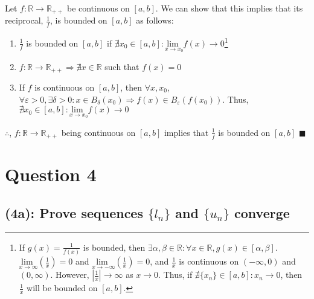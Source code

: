 \documentclass{article}
\newcommand{\R}{\mathbb{R}}
\newcommand{\lmt}{\underset{x\rightarrow\infty}{\text{lim }}}
\newcommand{\neglmt}{\underset{x\rightarrow-\infty}{\text{lim }}}
\begin{document}
Let $f:\R\rightarrow\R_{++}$ be continuous on $[a,b]$. We can show that this implies that its reciprocal, $\frac{1}{f}$, is bounded on $[a,b]$ as follows:
\begin{enumerate}

	\item $\frac{1}{f}$ is bounded on $[a,b]$  if $\nexists x_0\in[a,b]: \underset{x\rightarrow x_0}{\text{lim }}f(x)\rightarrow0$\footnote{
			If $g(x)=\frac{1}{f(x)}$ is bounded, then $\exists \alpha,\beta\in\R: \forall x\in\R,g(x)\in[\alpha,\beta]$. $\lmt(\frac{1}{x})=0$ and $\neglmt(\frac{1}{x})=0$, and $\frac{1}{x}$ is continuous on $(-\infty,0)$ and $(0,\infty)$. However, $|\frac{1}{x}|\rightarrow\infty$ as $x\rightarrow 0$. Thus, if $\nexists \{x_n\}\in[a,b]: x_n\rightarrow 0$, then $\frac{1}{x}$ will be bounded on $[a,b]$.
	} %
	
	\item $f:\R\rightarrow\R_{++}\Rightarrow\nexists x\in\R$ such that $f(x)=0$
	
	\item If $f$ is continuous on $[a,b]$, then $\forall x,x_0$, $\forall\varepsilon>0,\exists\delta>0:x\in B_\delta(x_0)\Rightarrow f(x)\in B_\varepsilon(f(x_0))$. Thus, $\nexists x_0\in[a,b]:\underset{x\rightarrow x_0}{\text{lim }}f(x)\rightarrow0$
\end{enumerate}
$\therefore$, $f:\R\rightarrow\R_{++}$ being continuous on $[a,b]$ implies that $\frac{1}{f}$ is bounded on $[a,b]$ $\blacksquare$


\section*{Question 4}

\subsection*{(4a): Prove sequences $\{l_n\}$ and $\{u_n\}$ converge}
\end{document}
